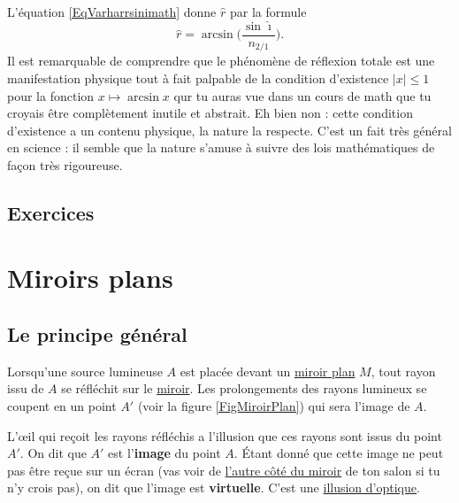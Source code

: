 \documentclass[a4paper,12pt]{book}
\theoremstyle{mes_exemples}	\newtheorem{exemple}[numtho]{Exemple}
\theoremstyle{mes_tho}
\newcommand{\defe}[2]{\textbf{#1}\index{#2}}
\begin{document}
L'équation \eqref{EqVarharrsinimath} donne $\hat r$ par la formule  \label{PgExpCErefrtot}
\[ 
  \hat r=\arcsin\Big( \frac{ \sin\hat\imath }{ n_{2/1} } \Big).
\]
Il est remarquable de comprendre que le phénomène de réflexion totale est une manifestation physique tout à fait palpable de la condition d'existence $| x |\leq1$ pour la fonction $x\mapsto\arcsin x$ qur tu auras vue dans un cours de math que tu croyais être complètement inutile et abstrait. Eh bien non : cette condition d'existence a un contenu physique, la nature la respecte. C'est un fait très général en science : il semble que la nature s'amuse à suivre des lois mathématiques de façon très rigoureuse. 

\subsection{Exercices}





\section{Miroirs plans}

\subsection{Le principe général}

Lorsqu'une source lumineuse $A$ est placée devant un \href{http://fr.wikipedia.org/wiki/Miroir_plan}{miroir plan} $M$, tout rayon issu de $A$ se réfléchit sur le \href{http://fr.wikipedia.org/wiki/Miroir}{miroir}. Les prolongements des rayons lumineux se coupent en un point $A'$ (voir la figure \ref{FigMiroirPlan}) qui sera l'image de $A$.

L'\oe il qui reçoit les rayons réfléchis a l'illusion que ces rayons sont issus du point $A'$. On dit que $A'$ est l'\defe{image}{} du point $A$. Étant donné que cette image ne peut pas être reçue sur un écran (vas voir de \href{http://fr.wikipedia.org/wiki/De_l'autre_côté_du_miroir}{l'autre côté du miroir} de ton salon si tu n'y crois pas),  on dit que l'image est \defe{virtuelle}{}. C'est une \href{http://fr.wikipedia.org/wiki/Illusion_d'optique}{illusion d'optique}. 
\end{document}
